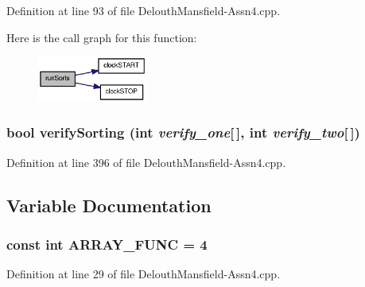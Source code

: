 Definition at line 93 of file DelouthMansfield-\/Assn4.cpp.



Here is the call graph for this function:\nopagebreak
\begin{figure}[H]
\begin{center}
\leavevmode
\includegraphics[width=102pt]{_delouth_mansfield-_assn4_8cpp_ab8afa82cf87b47530bd2505812a9fc82_cgraph}
\end{center}
\end{figure}


\hypertarget{_delouth_mansfield-_assn4_8cpp_ae2cf0cca1e089e83ae98750b96b8cf11}{
\subsubsection[{verifySorting}]{\setlength{\rightskip}{0pt plus 5cm}bool verifySorting (int {\em verify\_\-one}\mbox{[}$\,$\mbox{]}, \/  int {\em verify\_\-two}\mbox{[}$\,$\mbox{]})}}
\label{_delouth_mansfield-_assn4_8cpp_ae2cf0cca1e089e83ae98750b96b8cf11}


Definition at line 396 of file DelouthMansfield-\/Assn4.cpp.



\subsection{Variable Documentation}
\hypertarget{_delouth_mansfield-_assn4_8cpp_a3b95dd60d5c45f7cc3733769f3d54868}{
\subsubsection[{ARRAY\_\-FUNC}]{\setlength{\rightskip}{0pt plus 5cm}const int {\bf ARRAY\_\-FUNC} = 4}}
\label{_delouth_mansfield-_assn4_8cpp_a3b95dd60d5c45f7cc3733769f3d54868}


Definition at line 29 of file DelouthMansfield-\/Assn4.cpp.

